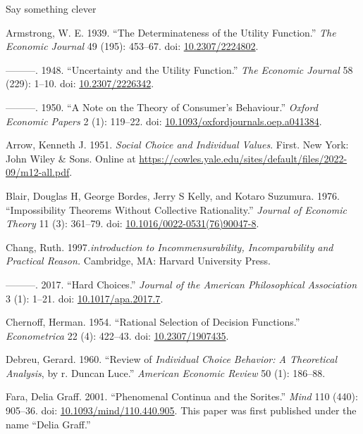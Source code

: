 \documentclass[
  11pt,
  letterpaper,
  DIV=11,
  numbers=noendperiod,
  twoside]{scrartcl}
\newlength{\cslhangindent}
\newenvironment{CSLReferences}[2] %
 {\begin{list}{}{%
  \setlength{\itemindent}{0pt}
  \setlength{\leftmargin}{0pt}
  \setlength{\parsep}{0pt}
  \ifodd #1
   \setlength{\leftmargin}{\cslhangindent}
   \setlength{\itemindent}{-1\cslhangindent}
  \fi
  \setlength{\itemsep}{#2\baselineskip}}}
 {\end{list}}
\begin{document}
Say something clever

\label{refs}
\begin{CSLReferences}{1}{0}
Armstrong, W. E. 1939. {``The Determinateness of the Utility
Function.''} \emph{The Economic Journal} 49 (195): 453--67. doi:
\href{https://doi.org/10.2307/2224802}{10.2307/2224802}.

---------. 1948. {``Uncertainty and the Utility Function.''} \emph{The
Economic Journal} 58 (229): 1--10. doi:
\href{https://doi.org/10.2307/2226342}{10.2307/2226342}.

---------. 1950. {``A Note on the Theory of Consumer's Behaviour.''}
\emph{Oxford Economic Papers} 2 (1): 119--22. doi:
\href{https://doi.org/10.1093/oxfordjournals.oep.a041384}{10.1093/oxfordjournals.oep.a041384}.

Arrow, Kenneth J. 1951. \emph{Social Choice and Individual Values}.
First. New York: John Wiley \& Sons. Online at
\url{https://cowles.yale.edu/sites/default/files/2022-09/m12-all.pdf}.

Blair, Douglas H, George Bordes, Jerry S Kelly, and Kotaro Suzumura.
1976. {``Impossibility Theorems Without Collective Rationality.''}
\emph{Journal of Economic Theory} 11 (3): 361--79. doi:
\href{https://doi.org/10.1016/0022-0531(76)90047-8}{10.1016/0022-0531(76)90047-8}.

Chang, Ruth. 1997\emph{.introduction to Incommensurability,
Incomparability and Practical Reason.} Cambridge, MA: Harvard University
Press.

---------. 2017. {``Hard Choices.''} \emph{Journal of the American
Philosophical Association} 3 (1): 1--21. doi:
\href{https://doi.org/10.1017/apa.2017.7}{10.1017/apa.2017.7}.

Chernoff, Herman. 1954. {``Rational Selection of Decision Functions.''}
\emph{Econometrica} 22 (4): 422--43. doi:
\href{https://doi.org/10.2307/1907435}{10.2307/1907435}.

Debreu, Gerard. 1960. {``Review of \emph{Individual Choice Behavior: A
Theoretical Analysis}, by r. Duncan Luce.''} \emph{American Economic
Review} 50 (1): 186--88.

Fara, Delia Graff. 2001. {``Phenomenal Continua and the Sorites.''}
\emph{Mind} 110 (440): 905--36. doi:
\href{https://doi.org/10.1093/mind/110.440.905}{10.1093/mind/110.440.905}.
This paper was first published under the name {``Delia Graff.''}


\end{CSLReferences}
\end{document}
